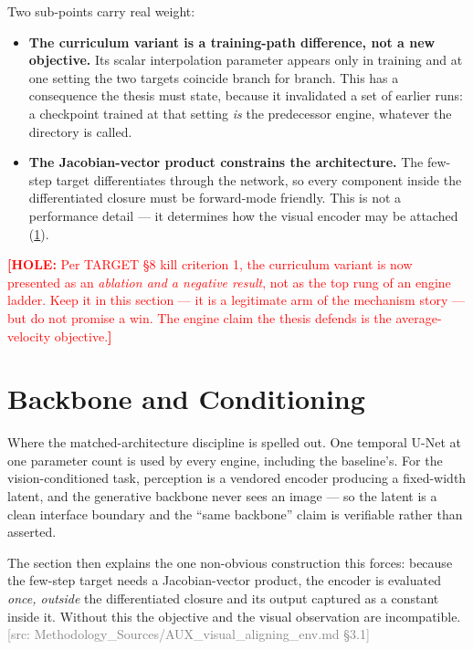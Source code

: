 \documentclass[headsepline,footsepline,footinclude=false,oneside,fontsize=11pt,paper=a4,listof=totoc,bibliography=totoc]{scrbook}
\newcommand{\hole}[1]{\textcolor{red}{\textbf{[HOLE:} #1\textbf{]}}}
\newcommand{\srcnote}[1]{\textcolor{gray}{\footnotesize\textsf{[src: #1]}}}
\begin{document}
Two sub-points carry real weight:

\begin{itemize}
  \item \textbf{The curriculum variant is a training-path difference, not a new objective.}
    Its scalar interpolation parameter appears only in training and at one setting the two
    targets coincide branch for branch. This has a consequence the thesis must state, because
    it invalidated a set of earlier runs: a checkpoint trained at that setting \emph{is} the
    predecessor engine, whatever the directory is called.
  \item \textbf{The Jacobian-vector product constrains the architecture.} The few-step target
    differentiates through the network, so every component inside the differentiated closure
    must be forward-mode friendly. This is not a performance detail --- it determines how the
    visual encoder may be attached (\ref{sec:method:backbone}).
\end{itemize}

\hole{Per TARGET \S8 kill criterion 1, the curriculum variant is now presented as an
\emph{ablation and a negative result}, not as the top rung of an engine ladder. Keep it in
this section --- it is a legitimate arm of the mechanism story --- but do not promise a win.
The engine claim the thesis defends is the average-velocity objective.}

\section{Backbone and Conditioning}\label{sec:method:backbone}

Where the matched-architecture discipline is spelled out. One temporal U-Net at one
parameter count is used by every engine, including the baseline's. For the vision-conditioned
task, perception is a vendored encoder producing a fixed-width latent, and the generative
backbone never sees an image --- so the latent is a clean interface boundary and the
``same backbone'' claim is verifiable rather than asserted.

The section then explains the one non-obvious construction this forces: because the few-step
target needs a Jacobian-vector product, the encoder is evaluated \emph{once, outside} the
differentiated closure and its output captured as a constant inside it. Without this the
objective and the visual observation are incompatible. \srcnote{Methodology\_Sources/AUX\_visual\_aligning\_env.md \S3.1}
\end{document}

